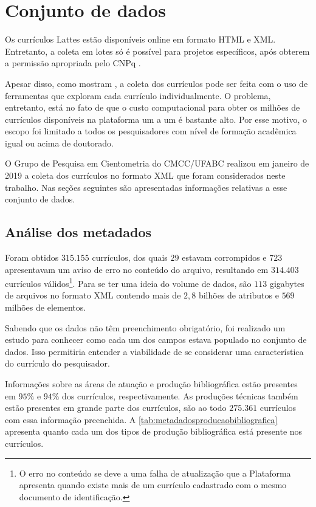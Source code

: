 \chapter[Conjunto de dados]{Conjunto de dados}

Os currículos Lattes estão disponíveis online em formato HTML e XML. Entretanto, a coleta em lotes só é possível para projetos específicos, após obterem a permissão apropriada pelo CNPq \cite{medeiros2013dynamics}.

Apesar disso, como mostram , a coleta dos currículos pode ser feita com o uso de ferramentas que exploram cada currículo individualmente. O problema, entretanto, está no fato de que o custo computacional para obter os milhões de currículos disponíveis na plataforma um a um é bastante alto. Por esse motivo, o escopo foi limitado a todos os pesquisadores com nível de formação acadêmica igual ou acima de doutorado.

O Grupo de Pesquisa em Cientometria do CMCC/UFABC realizou em janeiro de 2019 a coleta dos currículos no formato XML que foram considerados neste trabalho. Nas seções seguintes são apresentadas informações relativas a esse conjunto de dados.

\section{Análise dos metadados}

Foram obtidos $315.155$ currículos, dos quais $29$ estavam corrompidos e $723$ apresentavam um aviso de erro no conteúdo do arquivo, resultando em $314.403$ currículos válidos\footnote{O erro no conteúdo se deve a uma falha de atualização que a Plataforma apresenta quando existe mais de um currículo cadastrado com o mesmo documento de identificação.}. Para se ter uma ideia do volume de dados, são $113$ gigabytes de arquivos no formato XML contendo mais de $2,8$ bilhões de atributos e $569$ milhões de elementos.

Sabendo que os dados não têm preenchimento obrigatório, foi realizado um estudo para conhecer como cada um dos campos estava populado no conjunto de dados. Isso permitiria entender a viabilidade de se considerar uma característica do currículo do pesquisador.

Informações sobre as áreas de atuação e produção bibliográfica estão presentes em $95\%$ e $94\%$ dos currículos, respectivamente. As produções técnicas também estão presentes em grande parte dos currículos, são ao todo $275.361$ currículos com essa informação preenchida. A \autoref{tab:metadadosproducaobibliografica} apresenta quanto cada um dos tipos de produção bibliográfica está presente nos currículos. 

